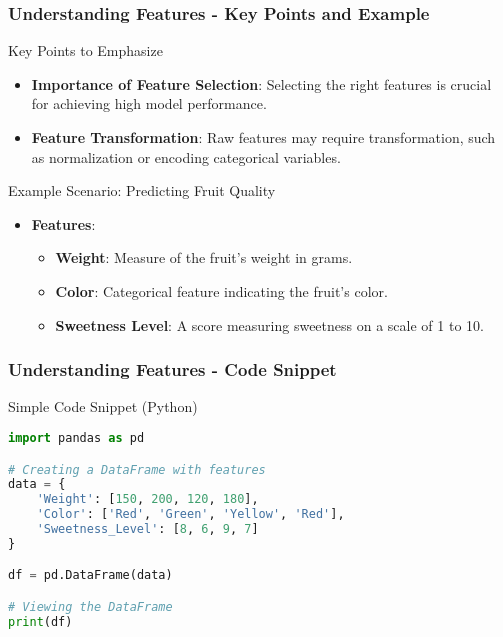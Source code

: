 \documentclass[aspectratio=169]{beamer}
\begin{document}
\begin{frame}[fragile]
    \frametitle{Understanding Features - Key Points and Example}
    \begin{block}{Key Points to Emphasize}
        \begin{itemize}
            \item \textbf{Importance of Feature Selection}: Selecting the right features is crucial for achieving high model performance.
            \item \textbf{Feature Transformation}: Raw features may require transformation, such as normalization or encoding categorical variables.
        \end{itemize}
    \end{block}

    \begin{block}{Example Scenario: Predicting Fruit Quality}
        \begin{itemize}
            \item \textbf{Features}:
                \begin{itemize}
                    \item \textbf{Weight}: Measure of the fruit's weight in grams.
                    \item \textbf{Color}: Categorical feature indicating the fruit's color.
                    \item \textbf{Sweetness Level}: A score measuring sweetness on a scale of 1 to 10.
                \end{itemize}
        \end{itemize}
    \end{block}
\end{frame}

\begin{frame}[fragile]
    \frametitle{Understanding Features - Code Snippet}
    \begin{block}{Simple Code Snippet (Python)}
        \begin{lstlisting}[language=Python]
import pandas as pd

# Creating a DataFrame with features
data = {
    'Weight': [150, 200, 120, 180],
    'Color': ['Red', 'Green', 'Yellow', 'Red'],
    'Sweetness_Level': [8, 6, 9, 7]
}

df = pd.DataFrame(data)

# Viewing the DataFrame
print(df)
        \end{lstlisting}
    \end{block}
\end{frame}
\end{document}
